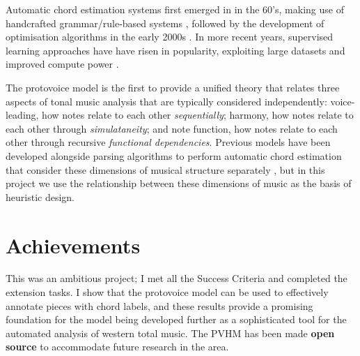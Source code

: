 \documentclass[12pt,a4paper,twoside,openright]{report}
\theoremstyle{definition}
\begin{document}
Automatic chord estimation systems first emerged in in the 60's, making use of handcrafted grammar/rule-based systems \cite{maxwellExpertSystemHarmonizing1992} \cite{winogradLinguisticsComputerAnalysis1968}, followed by the development of optimisation algorithms in the early 2000s \cite{pardoAlgorithmsChordalAnalysis2002}. In more recent years, supervised learning approaches have have risen in popularity, exploiting large datasets and improved compute power \cite{niEndtoendMachineLearning2011} \cite{mcleodModularSystemHarmonic2021} \cite{masadaChordRecognitionSymbolic2018}. 
\par 
The protovoice model is the first to provide a unified theory that relates three aspects of tonal music analysis that are typically considered independently: voice-leading, how notes relate to each other \textit{sequentially}; harmony, how notes relate to each other through \textit{simulataneity}; and note function, how notes relate to each other through recursive \textit{functional dependencies}. Previous models have been developed alongside parsing algorithms to perform automatic chord estimation that consider these dimensions of musical structure separately \cite{maxwellExpertSystemHarmonizing1992} \cite{winogradLinguisticsComputerAnalysis1968}, but in this project we use the relationship between these dimensions of music as the basis of heuristic design.
\par

\section{Achievements}

This was an ambitious project; I met all the Success Criteria and completed the extension tasks. I show that the protovoice model can be used to effectively annotate pieces with chord labels, and these results provide a promising foundation for the model being developed further as a sophisticated tool for the automated analysis of western total music. The PVHM has been made \textbf{open source} to accommodate future research in the area.


\end{document}
